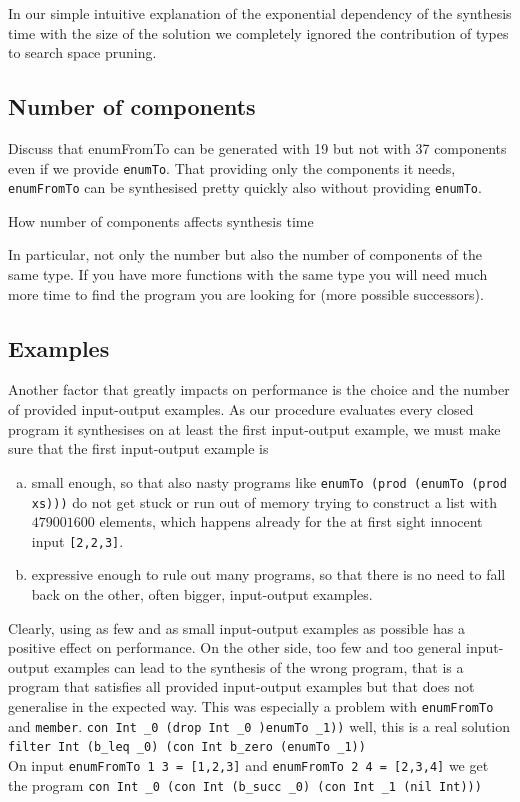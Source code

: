 In our simple intuitive explanation of the exponential dependency of the synthesis time with the size of the solution we completely ignored the contribution of types to search space pruning.

\subsection{Number of components}
Discuss that enumFromTo can be generated with 19 but not with 37 components even if we provide \lstinline?enumTo?. That providing only the components it needs, \lstinline?enumFromTo? can be synthesised pretty quickly also without providing \lstinline?enumTo?.

How number of components affects synthesis time

In particular, not only the number but also the number of components of the same type. If you have more functions with the same type you will need much more time to find the program you are looking for (more possible successors).

\subsection{Examples}
Another factor that greatly impacts on performance is the choice and the number of provided input-output examples. As our procedure evaluates every closed program it synthesises on at least the first input-output example, we must make sure that the first input-output example is
\begin{enumerate}[a.]
\item small enough, so that also nasty programs like \lstinline?enumTo (prod (enumTo (prod xs)))? do not get stuck or run out of memory trying to construct a list with $479001600$ elements, which happens already for the at first sight innocent input \lstinline?[2,2,3]?.
\item expressive enough to rule out many programs, so that there is no need to fall back on the other, often bigger, input-output examples.
\end{enumerate}
Clearly, using as few and as small input-output examples as possible has a positive effect on performance. On the other side, too few and too general input-output examples can lead to the synthesis of the wrong program, that is a program that satisfies all provided input-output examples but that does not generalise in the expected way. This was especially a problem with \lstinline?enumFromTo? and \lstinline?member?.
\lstinline?con Int _0 (drop Int _0 )enumTo _1))? well, this is a real solution\\
\lstinline?filter Int (b_leq _0) (con Int b_zero (enumTo _1))?\\
On input \lstinline?enumFromTo 1 3 = [1,2,3]? and \lstinline?enumFromTo 2 4 = [2,3,4]? we get the program \lstinline?con Int _0 (con Int (b_succ _0) (con Int _1 (nil Int)))?

